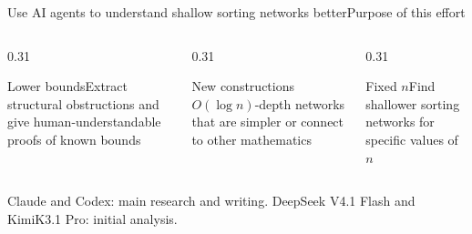 \documentclass[aspectratio=169,9pt,xcolor=table]{beamer}
\begin{document}
\begin{frame}{Use AI agents to understand shallow sorting networks better}{Purpose of this effort}
\begin{columns}[T]
\begin{column}{0.31\textwidth}\begin{card}{Lower bounds}Extract structural obstructions and give human-understandable proofs of known bounds\end{card}\end{column}
\begin{column}{0.31\textwidth}\begin{card}{New constructions}$O(\log n)$-depth networks that are simpler or connect to other mathematics\end{card}\end{column}
\begin{column}{0.31\textwidth}\begin{card}{Fixed $n$}Find shallower sorting networks for specific values of $n$\end{card}\end{column}
\end{columns}
\vspace{0.2cm}
{\scriptsize\color{muted}Claude and Codex: main research and writing. DeepSeek V4.1 Flash and KimiK3.1 Pro: initial analysis.}
\end{frame}
\end{document}
